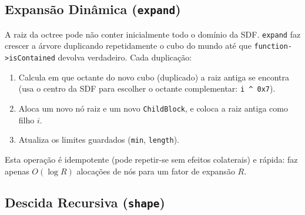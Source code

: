 \documentclass[10pt,a4paper]{article}
\begin{document}
\begin{center}
\end{center}

\subsection{Expansão Dinâmica (\texttt{expand})}

A raiz da octree pode não conter inicialmente todo o domínio da SDF.
\lstinline{expand} faz crescer a árvore duplicando repetidamente o
cubo do mundo até que \lstinline{function->isContained} devolva
verdadeiro. Cada duplicação:
\begin{enumerate}
  \item Calcula em que octante do novo cubo (duplicado) a raiz antiga
    se encontra (usa o centro da SDF para escolher o octante
    complementar: \lstinline{i ^ 0x7}).
  \item Aloca um novo nó raiz e um novo \lstinline{ChildBlock}, e
    coloca a raiz antiga como filho $i$.
  \item Atualiza os limites guardados (\lstinline{min},
    \lstinline{length}).
\end{enumerate}
Esta operação é idempotente (pode repetir-se sem efeitos colaterais)
e rápida: faz apenas $O(\log R)$ alocações de nós para um fator de
expansão $R$.

\subsection{Descida Recursiva (\texttt{shape})}
\label{sec:shape:shape}
\end{document}
